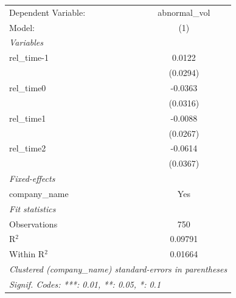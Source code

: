 
\begingroup
\centering
\begin{tabular}{lc}
   \tabularnewline \midrule \midrule
   Dependent Variable: & abnormal\_vol\\   
   Model:              & (1)\\  
   \midrule
   \emph{Variables}\\
   rel\_time-1         & 0.0122\\   
                       & (0.0294)\\   
   rel\_time0          & -0.0363\\   
                       & (0.0316)\\   
   rel\_time1          & -0.0088\\   
                       & (0.0267)\\   
   rel\_time2          & -0.0614\\   
                       & (0.0367)\\   
   \midrule
   \emph{Fixed-effects}\\
   company\_name       & Yes\\  
   \midrule
   \emph{Fit statistics}\\
   Observations        & 750\\  
   R$^2$               & 0.09791\\  
   Within R$^2$        & 0.01664\\  
   \midrule \midrule
   \multicolumn{2}{l}{\emph{Clustered (company\_name) standard-errors in parentheses}}\\
   \multicolumn{2}{l}{\emph{Signif. Codes: ***: 0.01, **: 0.05, *: 0.1}}\\
\end{tabular}
\par\endgroup


